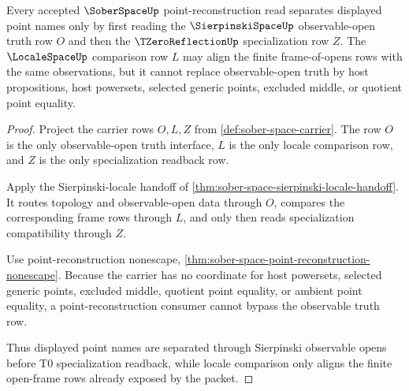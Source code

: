 \begin{theorem}
\label{thm:sober-space-specialization-basis}
Every accepted $\SoberSpaceUp$ point-reconstruction read separates displayed point names only by first reading the $\SierpinskiSpaceUp$ observable-open truth row $O$ and then the $\TZeroReflectionUp$ specialization row $Z$. The $\LocaleSpaceUp$ comparison row $L$ may align the finite frame-of-opens rows with the same observations, but it cannot replace observable-open truth by host propositions, host powersets, selected generic points, excluded middle, or quotient point equality.
\end{theorem}
\begin{proof}
Project the carrier rows $O,L,Z$ from \autoref{def:sober-space-carrier}. The row $O$ is the only observable-open truth interface, $L$ is the only locale comparison row, and $Z$ is the only specialization readback row.

Apply the Sierpinski-locale handoff of \autoref{thm:sober-space-sierpinski-locale-handoff}. It routes topology and observable-open data through $O$, compares the corresponding frame rows through $L$, and only then reads specialization compatibility through $Z$.

Use point-reconstruction nonescape, \autoref{thm:sober-space-point-reconstruction-nonescape}. Because the carrier has no coordinate for host powersets, selected generic points, excluded middle, quotient point equality, or ambient point equality, a point-reconstruction consumer cannot bypass the observable truth row.

Thus displayed point names are separated through Sierpinski observable opens before T0 specialization readback, while locale comparison only aligns the finite open-frame rows already exposed by the packet.
\end{proof}

